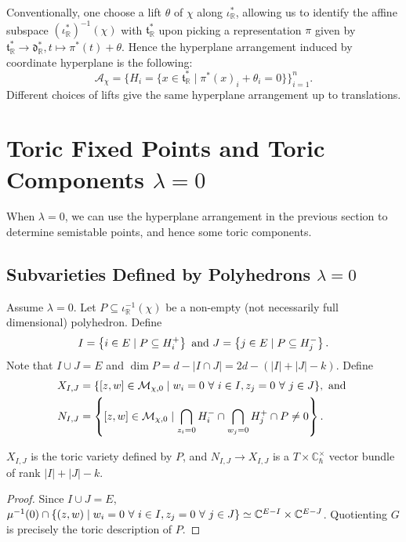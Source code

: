 \documentclass[b5paper]{article}
\newcommand{\mathintitle}[1]{\texorpdfstring{$#1$}{\detokenize{#1}}}
\newcommand{\MM}{\mathcal{M}}
\newcommand{\Chbar}{\mathbb{C}^\times _\hbar}
\begin{document}
Conventionally, one choose a lift $\theta$ of $\chi$ along $\iota_\mathbb{R}^*$, allowing us to identify the affine subspace $(\iota_{\mathbb{R}}^*)^{-1}(\chi)$ with $\mathfrak{t}_\mathbb{R}^*$ upon picking a representation $\pi$ given by $\mathfrak{t}^*_\mathbb{R}\rightarrow \mathfrak{d}_\mathbb{R}^*, t\mapsto \pi^*(t)+\theta$. Hence the hyperplane arrangement induced by coordinate hyperplane is the following:
\begin{equation*}
    \mathcal{A}_\chi = \{ H_i = \{ x \in \mathfrak{t}_{\mathbb{R}}^* \mid \pi^*(x)_i + \theta_i = 0\} \}_{i=1}^n.
\end{equation*}
Different choices of lifts give the same hyperplane arrangement up to translations.

\section{Toric Fixed Points and Toric Components \mathintitle{\lambda=0}}
\label{sec:torus_fixed_point_and_component}

When $\lambda=0$, we can use the hyperplane arrangement in the previous section to determine semistable points, and hence some toric components.

\subsection{Subvarieties Defined by Polyhedrons \mathintitle{\lambda=0}}

Assume $\lambda=0$.
Let $P\subseteq \iota^{-1}_\mathbb{R}(\chi)$ be a non-empty (not necessarily full dimensional) polyhedron. Define
\[
  I=\left\{i\in E\mid P\subseteq H_i^+\right\}
  \textnormal{ and }
  J=\left\{j\in E\mid P\subseteq H_j^-\right\}.
\]
Note that $I\cup J=E$ and $\dim P=d-|I\cap J|=2d-(|I|+|J|-k)$.
Define 
\begin{alignat*}{1}
    X_{I,J}&=\{[z,w]\in \MM_{\chi,0}\mid w_i=0\ \forall\ i\in I, z_j=0\ \forall\ j\in J\},\textnormal{ and }\\
    N_{I,J}&=\CB{[z,w]\in \MM_{\chi,0}\mid \bigcap_{z_i=0}H_i^-\cap \bigcap_{w_j=0}H_j^+\cap P\neq 0}.
\end{alignat*}
\begin{proposition}[pps:]{}
  $X_{I,J}$ is the toric variety defined by $P$, and $N_{I,J}\rightarrow X_{I,J}$ is a $T\times \Chbar$ vector bundle of rank $|I|+|J|-k$.
  \begin{proof}
      Since $I\cup J=E$, $\mu^{-1}(0)\cap \CB{(z,w)\mid w_i=0\ \forall\ i\in I, z_j=0\ \forall\ j\in J}\simeq \mathbb{C}^{E-I}\times \mathbb{C}^{E-J}$. Quotienting $G$ is precisely the toric description of $P$.
  \end{proof}
\end{proposition}
\end{document}
